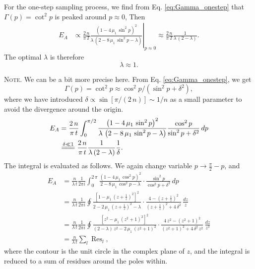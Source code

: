 \documentclass[reprint, floatfix]{revtex4-1}
\newcommand{\note}[1]{{\color{DarkGreen}\footnotesize \textsc{Note.} #1}}
\newcommand{\Err}{E}
\begin{document}
For the one-step sampling process,
we find from Eq. \eqref{eq:Gamma_onestep}
that $\Gamma(p) = \cot^2 p$
is peaked around $p \approx 0$,
%
Then
$$
\begin{aligned}
\Err_A
&
\propto
\frac{   2 \, n }
     { \pi \, T }
\left.
\frac{            \left(1 - 4 \, \mu_1 \, \sin^2 p \right)^2         }
     { \lambda \, \left(2 - 8 \, \mu_1 \, \sin^2 p - \lambda \right) }
\right|_{ p \approx 0 }
\approx
\frac{   2 \, n }
     { \pi \, T }
\frac{             1             }
     {  \lambda \, (2 - \lambda) }
.
\end{aligned}
$$
%
The optimal $\lambda$ is therefore
%
\begin{equation}
\lambda \approx 1.
\label{eq:lambda_nn_onestep}
\end{equation}
%
\note{We can be a bit more precise here.
%
From Eq. \eqref{eq:Gamma_onestep}, we get
%
$$
\Gamma(p) = \cot^2 p \approx \cos^2 p / (\sin^2 p + \delta^2),
$$
%
where we have introduced
$\delta \propto \sin[ \pi / (2 \, n) ] \sim 1/n$
as a small parameter to avoid the divergence
around the origin.
%
$$
\begin{aligned}
\Err_A
&=
\frac{   2 \, n }
     { \pi \, t }
\int_0^{\pi/2}
    \frac{            \left(1 - 4 \, \mu_1 \, \sin^2 p \right)^2         }
         { \lambda \, \left(2 - 8 \, \mu_1 \, \sin^2 p - \lambda \right) }
    \frac{ \cos^2 p }
         { \sin^2 p + \delta^2 }
\, dp
\notag \\
&
\stackrel{    \delta \ll 1     }
         { =\joinrel=\joinrel= }
\frac{   2 \, n }
     { \pi \, t }
\frac{             1             }
     {  \lambda \, (2 - \lambda) }
\frac{    1   }
     { \delta }
.
\end{aligned}
$$
The integral is evaluated as follows.
%
We again change variable $p \to \frac{ \pi } { 2 } - p$,
and
$$
\begin{aligned}
\Err_A
&=
\frac{n}{\lambda \, t}
\frac{1}{2 \pi i}
\int_0^{2 \, \pi}
\frac{ \left(1 - 4 \, \mu_1 \, \cos^2 p \right)^2 }
     {       2 - 8 \, \mu_1 \, \cos^2 p - \lambda }
\cdot
\frac{ \sin^2 p            }
     { \cos^2 p + \delta^2 }
\, dp
\\
&=
\frac{n}{\lambda \, t}
\frac{1}{2 \pi i}
\oint
\frac{ \left[1 -      \mu_1 \, \left(z + \frac{1}{z}\right)^2 \right]^2 }
     {       2 - 2 \, \mu_1 \, \left(z + \frac{1}{z}\right)^2 - \lambda }
\cdot
\frac{ 4 - \left( z + \frac 1 z \right)^2 }
     { \left( z + \frac 1 z \right)^2 + 4 \, \delta^2 }
\, \frac{dz}{z}
\\
&=
\frac{n}{\lambda \, t}
\frac{1}{2 \pi i}
\oint
\frac{ \left[z^2 -      \mu_1 \, (z^2 + 1)^2 \right]^2   }
     {  (2 - \lambda) \, z^2 - 2 \, \mu_1 \, (z^2 + 1)^2 }
\cdot
\frac{ 4 \, z^2 - ( z^2 + 1 )^2 }
     { ( z^2 + 1 )^2 + 4 \, \delta^2 \, z^2 }
\, \frac{ dz }{ z^3 }
\\
&=
\frac{ n } { \lambda \, t }
\sum_l \operatorname{Res}_l
,
\end{aligned}
$$
where the contour is the unit circle
in the complex plane of $z$,
and the integral is reduced to a sum of residues
around the poles within.

}
\end{document}
